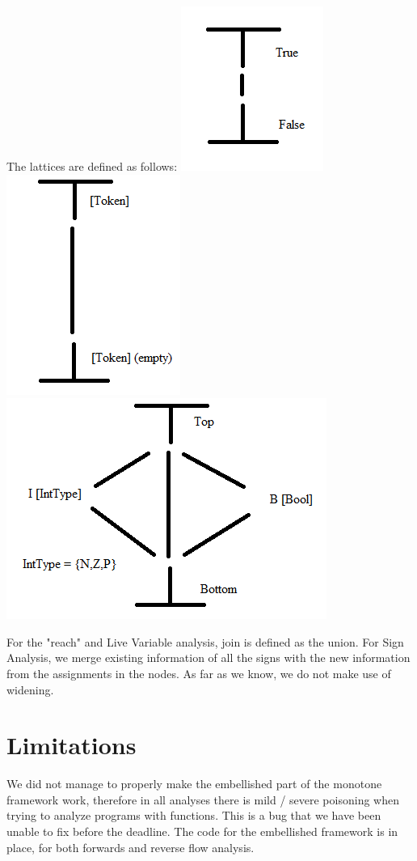 \documentclass[10pt]{article}
\begin{document}
The lattices are defined as follows: %
\includegraphics[scale=0.5]{latticeReach.png}
\includegraphics[scale=0.5]{latticeLive.png}
\includegraphics[scale=0.5]{latticeSign.png}

For the "reach" and Live Variable analysis, join is defined as the union. For Sign Analysis, we merge existing information of all the signs with the new information from the assignments in the nodes. As far as we know, we do not make use of widening.

\section{Limitations}
We did not manage to properly make the embellished part of the monotone framework work, therefore in all analyses there is mild / severe poisoning when trying to analyze programs with functions. This is a bug that we have been unable to fix before the deadline. The code for the embellished framework is in place, for both forwards and reverse flow analysis.
\end{document}
